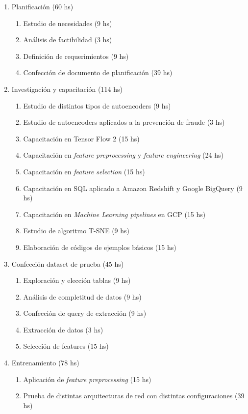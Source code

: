 \documentclass[
11pt, %
]{charter}
\begin{document}
\begin{enumerate}
\item Planificación (60 hs)
	\begin{enumerate}
		\item Estudio de necesidades (9 hs)
		\item Análisis de factibilidad (3 hs)
		\item Definición de requerimientos (9 hs)
		\item Confección de documento de planificación (39 hs)
	\end{enumerate}
\item Investigación y capacitación (114 hs)
	\begin{enumerate}
		\item Estudio de distintos tipos de autoencoders (9 hs)
		\item Estudio de autoencoders aplicados a la prevención de fraude (3 hs)
		\item Capacitación en Tensor Flow 2 (15 hs)
		\item Capacitación en \emph{feature preprocessing} y \emph{feature engineering} (24 hs)
		\item Capacitación en \emph{feature selection} (15 hs)
		\item Capacitación en SQL aplicado a Amazon Redshift y Google BigQuery (9 hs)
		\item Capacitación en \emph{Machine Learning pipelines} en GCP (15 hs)
		\item Estudio de algoritmo T-SNE (9 hs)
		\item Elaboración de códigos de ejemplos básicos (15 hs)
	\end{enumerate}
\item Confección dataset de prueba (45 hs)
	\begin{enumerate}
		\item Exploración y elección tablas (9 hs)
		\item Análisis de completitud de datos (9 hs)
		\item Confección de query de extracción (9 hs)
		\item Extracción de datos (3 hs)
		\item Selección de features (15 hs)
	\end{enumerate}
\item Entrenamiento (78 hs)
	\begin{enumerate}
		\item Aplicación de \emph{feature preprocessing} (15 hs)
		\item Prueba de distintas arquitecturas de red con distintas configuraciones (39 hs)

\end{enumerate}
\end{enumerate}
\end{document}

